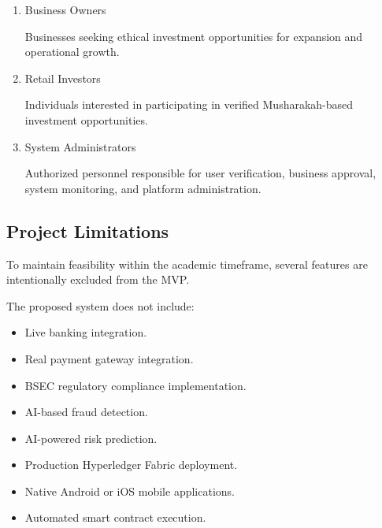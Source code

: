 \begin{enumerate}

\item Business Owners

Businesses seeking ethical investment opportunities for expansion and operational growth.

\item Retail Investors

Individuals interested in participating in verified Musharakah-based investment opportunities.

\item System Administrators

Authorized personnel responsible for user verification, business approval, system monitoring, and platform administration.

\end{enumerate}


\subsection{Project Limitations}

To maintain feasibility within the academic timeframe, several features are intentionally excluded from the MVP.

The proposed system does not include:

\begin{itemize}

\item Live banking integration.

\item Real payment gateway integration.

\item BSEC regulatory compliance implementation.

\item AI-based fraud detection.

\item AI-powered risk prediction.

\item Production Hyperledger Fabric deployment.

\item Native Android or iOS mobile applications.

\item Automated smart contract execution.

\end{itemize}


